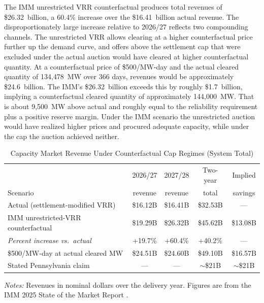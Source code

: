 The IMM unrestricted VRR counterfactual produces total revenues of
\$26.32~billion, a 60.4\% increase over the \$16.41~billion actual
revenue. The disproportionately large increase relative to 2026/27
reflects two compounding channels. The unrestricted VRR allows
clearing at a higher counterfactual price further up the demand curve,
and offers above the settlement cap that were excluded under the
actual auction would have cleared at higher counterfactual quantity.
At a counterfactual price of \$500/MW-day and the actual cleared quantity
of 134{,}478~MW over 366 days, revenues would be approximately
\$24.6~billion. The IMM's \$26.32~billion exceeds this by roughly
\$1.7~billion, implying a counterfactual cleared quantity of
approximately 144{,}000~MW. That is about 9{,}500~MW above actual and
roughly equal to the reliability requirement plus a positive reserve
margin. Under the IMM scenario the unrestricted auction would have
realized higher prices and procured adequate capacity, while under the
cap the auction achieved neither.

\begin{table}[H]
  \centering
  \caption{Capacity Market Revenue Under Counterfactual Cap Regimes
    (System Total)}
  \label{tab:capped_revenue}
  \small
  \begin{tabular}{lcccc}
    \toprule
                                                 & 2026/27 & 2027/28 & Two-year & Implied \\
    Scenario                                     & revenue & revenue & total    & savings \\
    \midrule
    Actual (settlement-modified VRR)             & \$16.12B & \$16.41B & \$32.53B & --- \\
    \addlinespace
    IMM unrestricted-VRR counterfactual          & \$19.29B & \$26.32B & \$45.62B & \$13.08B \\
    \quad \textit{Percent increase vs.\ actual}  & +19.7\%  & +60.4\%  & +40.2\%  & --- \\
    \addlinespace
    \$500/MW-day at actual cleared MW            & \$24.51B & \$24.60B & \$49.10B & \$16.57B \\
    \addlinespace
    Stated Pennsylvania claim                    & ---      & ---      & $\sim$\$21B & $\sim$\$21B \\
    \bottomrule
  \end{tabular}
  \vspace{3pt}

  \begin{minipage}{0.96\textwidth}
    \footnotesize \textit{Notes:} Revenues in nominal dollars over the delivery year. Figures are from the
    IMM 2025 State of the Market Report \citep{MonitoringAnalytics2025_sotm}.
  \end{minipage}
\end{table}

